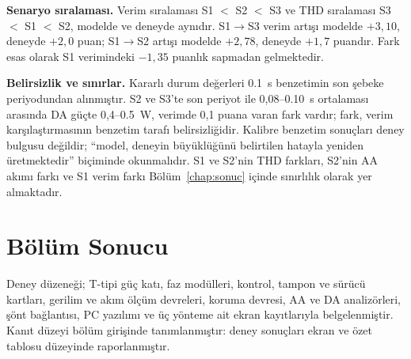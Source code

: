 
\textbf{Senaryo sıralaması.} Verim sıralaması S1 $<$ S2 $<$ S3 ve THD sıralaması S3 $<$ S1 $<$ S2, modelde ve deneyde aynıdır. S1$\rightarrow$S3 verim artışı modelde $+3{,}10$, deneyde $+2{,}0$ puan; S1$\rightarrow$S2 artışı modelde $+2{,}78$, deneyde $+1{,}7$ puandır. Fark esas olarak S1 verimindeki $-1{,}35$ puanlık sapmadan gelmektedir.

\textbf{Belirsizlik ve sınırlar.} Kararlı durum değerleri \SI{0.1}{\second} benzetimin son şebeke periyodundan alınmıştır. S2 ve S3'te son periyot ile 0,08--\SI{0.10}{\second} ortalaması arasında DA güçte 0,4--\SI{0.5}{\watt}, verimde 0,1 puana varan fark vardır; fark, verim karşılaştırmasının benzetim tarafı belirsizliğidir. Kalibre benzetim sonuçları deney bulgusu değildir; ``model, deneyin büyüklüğünü belirtilen hatayla yeniden üretmektedir'' biçiminde okunmalıdır. S1 ve S2'nin THD farkları, S2'nin AA akımı farkı ve S1 verim farkı Bölüm~\ref{chap:sonuc} içinde sınırlılık olarak yer almaktadır.

\section{Bölüm Sonucu}

Deney düzeneği; T-tipi güç katı, faz modülleri, kontrol, tampon ve sürücü kartları, gerilim ve akım ölçüm devreleri, koruma devresi, AA ve DA analizörleri, şönt bağlantısı, PC yazılımı ve üç yönteme ait ekran kayıtlarıyla belgelenmiştir. Kanıt düzeyi bölüm girişinde tanımlanmıştır: deney sonuçları ekran ve özet tablosu düzeyinde raporlanmıştır.

